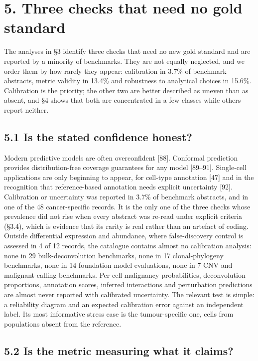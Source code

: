 \documentclass[11pt]{article}
\begin{document}
\section{5. Three checks that need no gold standard}\label{three-checks-that-need-no-gold-standard}

The analyses in §3 identify three checks that need no new gold standard
and are reported by a minority of benchmarks. They are not equally
neglected, and we order them by how rarely they appear: calibration in
3.7\% of benchmark abstracts, metric validity in 13.4\% and robustness
to analytical choices in 15.6\%. Calibration is the priority; the other
two are better described as uneven than as absent, and §4 shows that
both are concentrated in a few classes while others report neither.

\subsection{5.1 Is the stated confidence honest?}\label{is-the-stated-confidence-honest}

Modern predictive models are often overconfident {[}88{]}. Conformal
prediction provides distribution-free coverage guarantees for any model
{[}89--91{]}. Single-cell applications are only beginning to appear, for
cell-type annotation {[}47{]} and in the recognition that
reference-based annotation needs explicit uncertainty {[}92{]}.
Calibration or uncertainty was reported in 3.7\% of benchmark abstracts,
and in one of the 48 cancer-specific records. It is the only one of the
three checks whose prevalence did not rise when every abstract was
re-read under explicit criteria (§3.4), which is evidence that its
rarity is real rather than an artefact of coding. Outside differential
expression and abundance, where false-discovery control is assessed in 4
of 12 records, the catalogue contains almost no calibration analysis:
none in 29 bulk-deconvolution benchmarks, none in 17 clonal-phylogeny
benchmarks, none in 14 foundation-model evaluations, none in 7 CNV and
malignant-calling benchmarks. Per-cell malignancy probabilities,
deconvolution proportions, annotation scores, inferred interactions and
perturbation predictions are almost never reported with calibrated
uncertainty. The relevant test is simple: a reliability diagram and an
expected calibration error against an independent label. Its most
informative stress case is the tumour-specific one, cells from
populations absent from the reference.

\subsection{5.2 Is the metric measuring what it claims?}\label{is-the-metric-measuring-what-it-claims}
\end{document}
